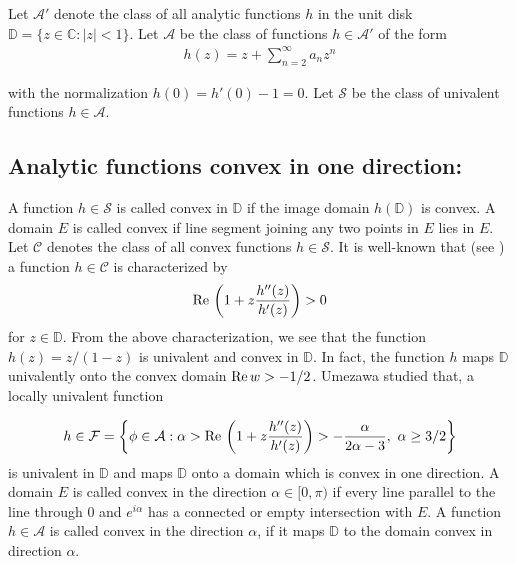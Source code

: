 \documentclass[a4paper,12pt]{amsart}
\theoremstyle{definition}
\newcounter {own}
\begin{document}
	Let $\mathcal{A'}$ denote the class of all analytic functions $h$ in the unit disk $\mathbb{D}=\{z\in\mathbb{C}:|z|<1\}.$
	Let $\mathcal{A}$ be the class of functions $h\in\mathcal{A'}$ of the form
	\begin{align}\label{P800}
		h(z)=z+\sum\limits_{n=2}^\infty a_n z^n
	\end{align}
	
	with the normalization $h(0)=h'(0)-1=0.$ Let $\mathcal{S}$ be the class of univalent functions $h\in\mathcal{A}$.
		\subsection{Analytic functions convex in one direction:}
	 A function $h\in\mathcal{S}$ is called convex in $\mathbb{D}$ if the image domain $h(\mathbb{D})$ is convex. A domain $E$ is called convex if line segment joining any two points in $E$ lies in $E.$ Let $\mathcal{C}$ denotes the class of all convex functions $h\in\mathcal{S}$. It is well-known that (see \cite{Duren-1983}) a function $h\in\mathcal{C}$ is characterized by
	\begin{align*}
		{\rm Re\,}\left(1+z\frac{h''(z)}{h'(z)}\right)>0
	\end{align*}
	for $z\in\mathbb{D}.$ From the above characterization, we see that the function $h(z)=z/(1-z)$ is univalent and convex in $\mathbb{D}$. In fact, the function $h$ maps $\mathbb{D}$ univalently onto the convex domain ${\rm Re\,}w >-1/2$. Umezawa \cite{Umezawa-1952} studied that, a locally univalent function
	
		\begin{align*}
	h\in\mathcal{F}=\left\{\phi\in\mathcal{A}:\alpha>{\rm Re\,}\left(1+z\frac{h''(z)}{h'(z)}\right)>-\frac{\alpha}{2\alpha-3},~\alpha\geq 3/2\right\}	
	\end{align*}
	 is univalent in $\mathbb{D}$ and maps $\mathbb{D}$  onto a domain which is convex in one direction. A	domain $E$ is called convex in the direction $\alpha\in[0,\pi)$ if every line parallel to the line through $0$ and $e^{i\alpha}$ has a connected or empty intersection with $E$. A function $h\in\mathcal{A}$ is called convex in the direction $\alpha$, if it maps $\mathbb{D}$
	to the domain convex in direction $\alpha.$
\end{document}
